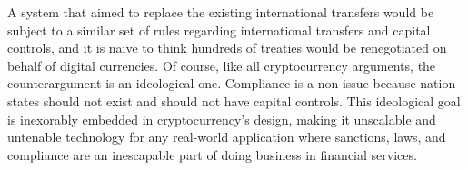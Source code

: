 A system that aimed to replace the existing international transfers would be
subject to a similar set of rules regarding international transfers and capital
controls, and it is naive to think hundreds of treaties would be renegotiated on
behalf of digital currencies. Of course, like all cryptocurrency arguments, the
counterargument is an ideological one. Compliance is a non-issue because
nation-states should not exist and should not have capital controls. This
ideological goal is inexorably embedded in cryptocurrency's design, making it
unscalable and untenable technology for any real-world application where
sanctions, laws, and compliance are an inescapable part of doing business in
financial services.

